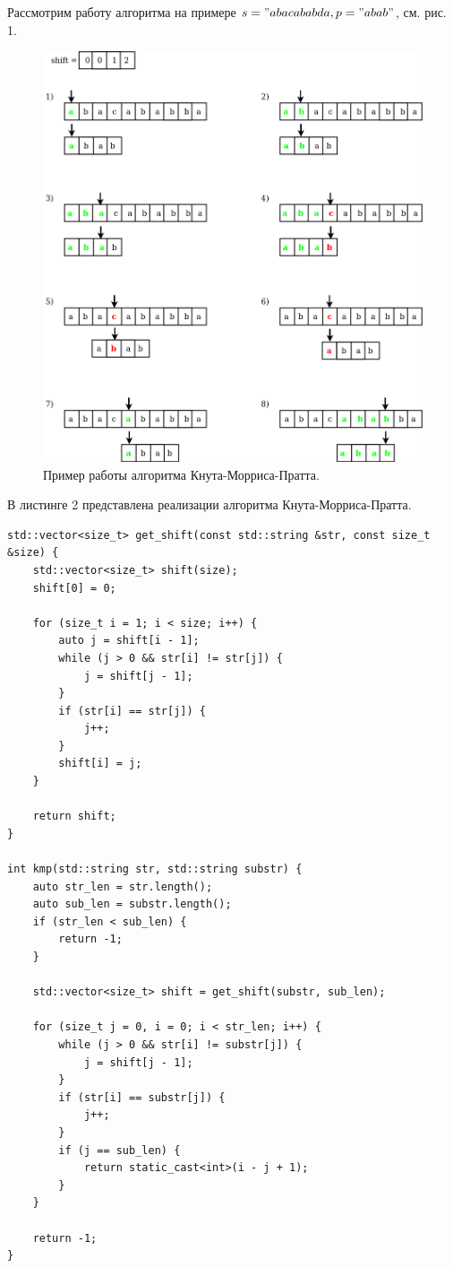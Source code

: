 \documentclass[a4paper,12pt]{article}
\begin{document}
Рассмотрим работу алгоритма на примере $s = "abacababda, p = "abab"$, см. рис. 1.
\begin{figure}[H]	
			 	{
			 		\centering
			 		\includegraphics[scale=0.41]{1.png}
			 		\caption{Пример работы алгоритма Кнута-Морриса-Пратта.}
			 		\label{pic:ant_schema}
			 	}
			 \end{figure}

В листинге 2 представлена реализации алгоритма Кнута-Морриса-Пратта.
\begin{lstlisting}[frame=single,caption=Алгоритм Кнута-Морриса-Пратта, breaklines]
std::vector<size_t> get_shift(const std::string &str, const size_t &size) {
    std::vector<size_t> shift(size);
    shift[0] = 0;

    for (size_t i = 1; i < size; i++) {
        auto j = shift[i - 1];
        while (j > 0 && str[i] != str[j]) {
            j = shift[j - 1];
        }
        if (str[i] == str[j]) {
            j++;
        }
        shift[i] = j;
    }

    return shift;
}

int kmp(std::string str, std::string substr) {
    auto str_len = str.length();
    auto sub_len = substr.length();
    if (str_len < sub_len) {
        return -1;
    }

    std::vector<size_t> shift = get_shift(substr, sub_len);

    for (size_t j = 0, i = 0; i < str_len; i++) {
        while (j > 0 && str[i] != substr[j]) {
            j = shift[j - 1];
        }
        if (str[i] == substr[j]) {
            j++;
        }
        if (j == sub_len) {
            return static_cast<int>(i - j + 1);
        }
    }

    return -1;
}
\end{lstlisting}
\newpage
\end{document}
